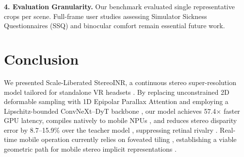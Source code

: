 \documentclass[conference]{IEEEtran}
\newcommand{\ours}{Scale-Liberated StereoINR}
\begin{document}
\textbf{4. Evaluation Granularity.} Our benchmark evaluated single representative crops per scene. Full-frame user studies assessing Simulator Sickness Questionnaires (SSQ) \cite{simulator_sickness} and binocular comfort \cite{retinal_rivalry, binocular_fusion} remain essential future work.

\section{Conclusion}
We presented \ours{}, a continuous stereo super-resolution model tailored for standalone VR headsets \cite{quest3_optics}. By replacing unconstrained 2D deformable sampling with 1D Epipolar Parallax Attention \cite{passr} and employing a Lipschitz-bounded ConvNeXt--DyT backbone \cite{convnext, dyt}, our model achieves 57.4$\times$ faster GPU latency, compiles natively to mobile NPUs \cite{qnn_sdk}, and reduces stereo disparity error by 8.7--15.9\% over the teacher model \cite{stereoinr}, suppressing retinal rivalry \cite{retinal_rivalry, binocular_fusion}. Real-time mobile operation currently relies on foveated tiling \cite{foveated_rendering, patney_foveated}, establishing a viable geometric path for mobile stereo implicit representations \cite{liif, lte, ultrasr}.



\end{document}
